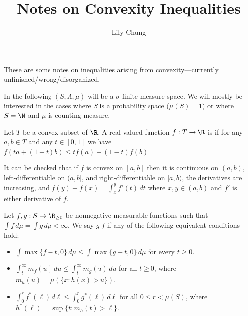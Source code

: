 \documentclass{article}
\title{Notes on Convexity Inequalities}
\author{Lily Chung}
\date{}
\begin{document}
\maketitle

These are some notes on inequalities arising from convexity---currently unfinished/wrong/disorganized.

In the following $(S, \Lambda, \mu)$ will be a $\sigma$-finite measure space.
We will mostly be interested in the cases where $S$ is a probability space ($\mu(S) = 1$) or where $S = \N$ and $\mu$ is counting measure.

\begin{definition}
  Let $T$ be a convex subset of $\R$.
  A real-valued function $f : T \to \R$ is  if for any $a, b \in T$ and any $t \in [0, 1]$ we have $f(ta + (1 - t)b) \le tf(a) + (1 - t)f(b)$.
\end{definition}

It can be checked that if $f$ is convex on $[a, b]$ then it is continuous on $(a, b)$, left-differentiable on $(a, b]$, and right-differentiable on $[a, b)$, the derivatives are increasing, and $f(y) - f(x) = \int_x^y f'(t)\,dt$ where $x, y \in (a, b)$ and $f'$ is either derivative of $f$.



\begin{definition}
  Let $f, g : S \to \R_{\ge 0}$ be nonnegative measurable functions such that $\int f\,d\mu = \int g\,d\mu < \infty$.
  We say $g$  $f$ if any of the following equivalent conditions hold:
  \begin{itemize}
  \item $\int \max\{f - t, 0\}\,d\mu \le \int \max\{g - t, 0\}\,d\mu$ for every $t \ge 0$.
  \item $\int_t^\infty m_f(u)\,du \le \int_t^\infty m_g(u)\,du$ for all $t \ge 0$, where $m_h(u) = \mu(\{x : h(x) > u\})$.
  \item $\int_0^r f^*(\ell)\,d\ell \le \int_0^r g^*(\ell)\,d\ell$ for all $0 \le r < \mu(S)$, where $h^*(\ell) = \sup\{t : m_h(t) > \ell\}$.
  \end{itemize}
\end{definition}
\end{document}
